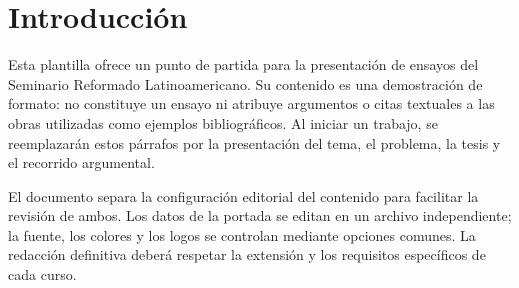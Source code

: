\section*{Introducción}
Esta plantilla ofrece un punto de partida para la presentación de ensayos del Seminario Reformado Latinoamericano.
Su contenido es una demostración de formato: no constituye un ensayo ni atribuye argumentos o citas textuales a las obras utilizadas como ejemplos bibliográficos.
Al iniciar un trabajo, se reemplazarán estos párrafos por la presentación del tema, el problema, la tesis y el recorrido argumental.

El documento separa la configuración editorial del contenido para facilitar la revisión de ambos.
Los datos de la portada se editan en un archivo independiente; la fuente, los colores y los logos se controlan mediante opciones comunes.
La redacción definitiva deberá respetar la extensión y los requisitos específicos de cada curso.

